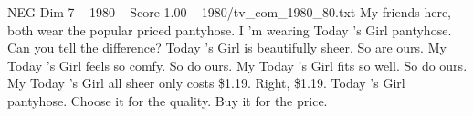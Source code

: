 \begin{textsample}{NEG Dim 7 – 1980 – Score 1.00 – 1980/tv\_com\_1980\_80.txt}  \label{ex:f7_neg_054}
My friends here, both wear the popular priced pantyhose.
I 'm wearing Today 's Girl pantyhose.
Can you tell the difference?
Today 's Girl is beautifully sheer.
So are ours.
My Today 's Girl feels so comfy.
So do ours.
My Today 's Girl fits so well.
So do ours.
My Today 's Girl all sheer only costs \$1.19.
Right, \$1.19.
Today 's Girl pantyhose.
Choose it for the quality.
Buy it for the price.

\end{textsample}
